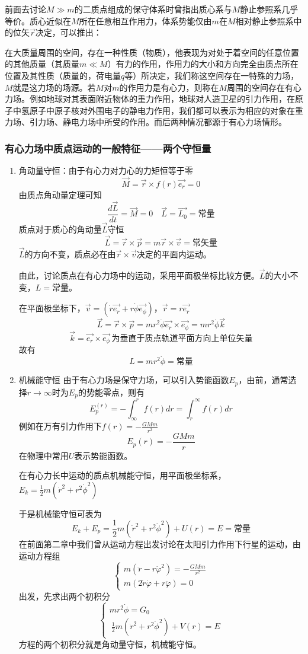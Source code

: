 前面去讨论$M\gg m$的二质点组成的保守体系时曾指出质心系与$M$静止参照系几乎等价。质心近似在$M$所在任意相互作用力，体系势能仅由$m$在$M$相对静止参照系中的位矢$\vec{r}$决定，可以推出：

在大质量周围的空间，存在一种性质（物质），他表现为对处于着空间的任意位置的其他质量（其质量$m\ll M$）有力的作用，作用力的大小和方向完全由质点所在位置及其性质（质量的，荷电量$q$等）所决定，我们称这空间存在一特殊的力场，$M$就是这力场的场源。若$M$对$m$的作用力是有心力，则称在$M$周围的空间存在有心力场。例如地球对其表面附近物体的重力作用，地球对人造卫星的引力作用，在原子中氢原子中原子核对外围电子的静电力作用，我们都可以表示为相应的对象在重力场、引力场、静电力场中所受的作用。而后两种情况都源于有心力场情形。
\subsubsection{有心力场中质点运动的一般特征——两个守恒量}
\begin{enumerate}
\item 角动量守恒：由于有心力对力心的力矩恒等于零
\[\vec{M}=\vec{r}\times f(r)\vec{e_r}=0\]
由质点角动量定理可知
\[\frac{d\vec{L}}{dt}=\vec{M}=0\quad \vec{L}=\vec{L_0}=\text{常量}\]
质点对于质心的角动量$\vec{L}$守恒
\[\vec{L}=\vec{r}\times\vec{p}=m\vec{r}\times\vec{v}=常矢量\]
$\vec{L}$的方向不变，质点必在由$\vec{r}\times\vec{v}$决定的平面内运动。

由此，讨论质点在有心力场中的运动，采用平面极坐标比较方便。$\vec{L}$的大小不变，$L=$常量。

在平面极坐标下，$\vec{v}=(\dot{r}\vec{e_r}+r\dot{\phi}\vec{e_{\phi}})$，$\vec{r}=r\vec{e_r}$
\[\vec{L}=\vec{r}\times\vec{p}=mr^2\dot{\phi} \vec{e_r}\times\vec{e_\phi}=mr^2\dot{\phi}\vec{k}\]
\[\vec{k}=\vec{e_r}\times\vec{e_\phi}\,\text{为垂直于质点轨道平面方向上单位矢量}\]
故有
\[L=mr^2\dot{\phi}=\text{常量}\]

\item 机械能守恒
由于有心力场是保守力场，可以引入势能函数$E_p$，由前，通常选择$r\to\infty$时为$E_p$的势能零点，则有
\[E_p^{(r)}=-\int_\infty^r f(r) dr = \int_r^\infty f(r) dr\]
例如在万有引力作用下$f(r)=-\frac{GMm}{r^2}$
\[E_p(r)=-\frac{GMm}{r}\]
在物理中常用$U$表示势能函数。

在有心力长中运动的质点机械能守恒，用平面极坐标系，$E_k=\frac{1}{2}m(\dot{r}^2+r^2\dot{\phi}^2)$

于是机械能守恒可表为
\[E_k+E_p=\frac{1}{2}m(\dot{r}^2+r^2\dot{\phi}^2)+U(r)=E=\text{常量}\]
在前面第二章中我们曾从运动方程出发讨论在太阳引力作用下行星的运动，由运动方程组
\[\begin{cases}
m(\ddot{r}-r\dot{\varphi}^2)=-\frac{GMm}{r^2}\\
m(2\dot{r}\dot{\varphi}+r\ddot{\varphi})=0
\end{cases}
\]
出发，先求出两个初积分
\[\begin{cases}
mr^2\dot{\phi}=G_0\\\
\frac{1}{2}m(\dot{r}^2+r^2\dot{\phi}^2)+V(r)=E
\end{cases}
\]
方程的两个初积分就是角动量守恒，机械能守恒。
\end{enumerate}
